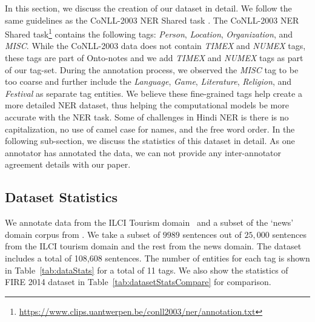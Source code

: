 \documentclass[10pt, a4paper]{article}
\begin{document}
In this section, we discuss the creation of our dataset in detail. We follow the same guidelines as the CoNLL-2003 NER Shared task \cite{TjongKimSang:2003:ICS:1119176.1119195}. The CoNLL-2003 NER Shared task\footnote{\url{https://www.clips.uantwerpen.be/conll2003/ner/annotation.txt}} contains the following tags: \textit{Person}, \textit{Location}, \textit{Organization}, and \textit{MISC}. While the CoNLL-2003 data does not contain \textit{TIMEX} and \textit{NUMEX} tags, these tags are part of Onto-notes \cite{pradhan-etal-2013-towards} and we add \textit{TIMEX} and \textit{NUMEX} tags as part of our tag-set. During the annotation process, we observed the \textit{MISC} tag to be too coarse and further include the \textit{Language}, \textit{Game}, \textit{Literature}, \textit{Religion}, and \textit{Festival} as separate tag entities. We believe these fine-grained tags help create a more detailed NER dataset, thus helping the computational models be more accurate with the NER task. Some of challenges in Hindi NER is there is no capitalization, no use of camel case for names, and the free word order.
In the following sub-section, we discuss the statistics of this dataset in detail. As one annotator has annotated the data, we can not provide any inter-annotator agreement details with our paper. 

\begin{table}[!t]
\centering
{}
\caption{\textbf{HiNER} dataset statistics in terms of the number of sentences (\#sentences), number of words (\#words), and the splits created for the Hindi NER task}
\label{tab:dataSplit}
\end{table}

\subsection{Dataset Statistics}

We annotate data from the ILCI Tourism domain~\cite{jha} and a subset of the `news' domain corpus from . We take a subset of $9989$ sentences out of $25,000$ sentences from the ILCI tourism domain and the rest from the news domain. The dataset includes a total of 108,608 sentences. The number of entities for each tag is shown in Table~\ref{tab:dataStats} for a total of 11 tags. We also show the statistics of FIRE 2014 dataset in Table~\ref{tab:datasetStatsCompare} for comparison.
\end{document}
